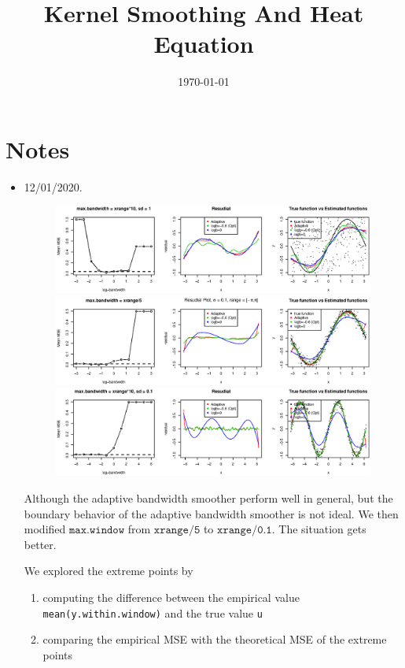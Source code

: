 \documentclass{article}
\title{Kernel Smoothing And Heat Equation}
\date{\today}
\begin{document}
\maketitle

\section{Notes}
\label{sec:notes}

\begin{itemize}
\item 12/01/2020. 
\begin{figure}[H]
\includegraphics[width=\linewidth]{pic/sim.plot1.eps}
\includegraphics[width=\linewidth]{pic/sim.plot2.eps}
\includegraphics[width=\linewidth]{pic/sim.plot3.eps}
\end{figure}

Although the adaptive bandwidth smoother perform well in general, but the boundary behavior of the adaptive bandwidth smoother is not ideal. We then modified $\texttt{max.window}$ from $\texttt{xrange/5}$ to $\texttt{xrange/0.1}$. The situation gets better. 

We explored the extreme points by 
\begin{enumerate}
\item computing the difference between the empirical value \texttt{mean(y.within.window)} and the true value \texttt{u}
\item comparing the empirical MSE with the theoretical MSE of the extreme points
\end{enumerate}


\end{itemize}
\end{document}
